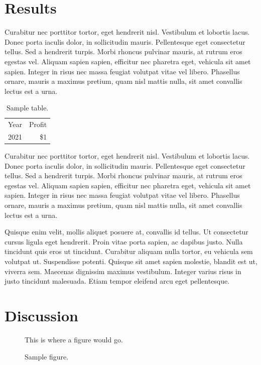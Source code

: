 \documentclass{brandeis-thesis3.2}
\begin{document}
\chapter{Results}

Curabitur nec porttitor tortor, eget hendrerit nisl. Vestibulum et lobortis lacus. Donec porta iaculis dolor, in sollicitudin mauris. Pellentesque eget consectetur tellus. Sed a hendrerit turpis. Morbi rhoncus pulvinar mauris, at rutrum eros egestas vel. Aliquam sapien sapien, efficitur nec pharetra eget, vehicula sit amet sapien. Integer in risus nec massa feugiat volutpat vitae vel libero. Phasellus ornare, mauris a maximus pretium, quam nisl mattis nulla, sit amet convallis lectus est a urna.

\begin{table}[t]
    \centering
    \begin{tabular}{lr}
         Year & Profit \\
         2021 & \$1 \\
    \end{tabular}
    \caption{Sample table.}
    \label{tab:sample}
\end{table}


Curabitur nec porttitor tortor, eget hendrerit nisl. Vestibulum et lobortis lacus. Donec porta iaculis dolor, in sollicitudin mauris. Pellentesque eget consectetur tellus. Sed a hendrerit turpis. Morbi rhoncus pulvinar mauris, at rutrum eros egestas vel. Aliquam sapien sapien, efficitur nec pharetra eget, vehicula sit amet sapien. Integer in risus nec massa feugiat volutpat vitae vel libero. Phasellus ornare, mauris a maximus pretium, quam nisl mattis nulla, sit amet convallis lectus est a urna.

Quisque enim velit, mollis aliquet posuere at, convallis id tellus. Ut consectetur cursus ligula eget hendrerit. Proin vitae porta sapien, ac dapibus justo. Nulla tincidunt quis eros ut tincidunt. Curabitur aliquam nulla tortor, eu vehicula sem volutpat ut. Suspendisse potenti. Quisque sit amet sapien molestie, blandit est ut, viverra sem. Maecenas dignissim maximus vestibulum. Integer varius risus in justo tincidunt malesuada. Etiam tempor eleifend arcu eget pellentesque.

\chapter{Discussion}

\begin{figure}[t]
    \centering
    This is where a figure would go.
    \caption{Sample figure.}
    \label{fig:sample}
\end{figure}
\end{document}
